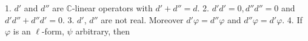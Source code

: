 1. $d'$ and $d''$ are $\mathbb{C}$-linear operators with $d' + d'' = d$.
2. $d' d' = 0, d'' d'' = 0$ and $d' d'' + d'' d' = 0$.
3. $d'$, $d''$ are not real. Moreover $d' \varphi = d'' \varphi$ and $d'' \varphi = d' \varphi$.
4. If $\varphi$ is an $\ell$-form, $\psi$ arbitrary, then
